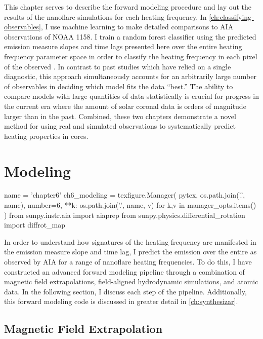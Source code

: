 This chapter serves to describe the forward modeling procedure and lay out the results of the nanoflare simulations for each heating frequency. In \autoref{ch:classifying-observables}, I use machine learning to make detailed comparisons to AIA observations of \AR{} NOAA 1158. I train a random forest classifier using the predicted emission measure slopes and time lags presented here over the entire heating frequency parameter space in order to classify the heating frequency in each pixel of the observed \AR{}. In contrast to past studies which have relied on a single diagnostic, this approach simultaneously accounts for an arbitrarily large number of observables in deciding which model fits the data ``best.'' The ability to compare models with large quantities of data statistically is crucial for progress in the current era where the amount of solar coronal data is orders of magnitude larger than in the past.  Combined, these two chapters demonstrate a novel method for using real and simulated observations to systematically predict heating properties in \AR{} cores.

\section{Modeling}\label{sec:modeling-observables:modeling}

\begin{pycode}
name = 'chapter6'
ch6_modeling = texfigure.Manager(
    pytex,
    os.path.join('.', name),
    number=6,
    **{k: os.path.join('.', name, v) for k,v in manager_opts.items()}
)
from sunpy.instr.aia import aiaprep
from sunpy.physics.differential_rotation import diffrot_map
\end{pycode}

In order to understand how signatures of the heating frequency are manifested in the emission measure slope and time lag, I predict the emission over the entire \AR{} as observed by AIA for a range of nanoflare heating frequencies. To do this, I have constructed an advanced forward modeling pipeline through a combination of magnetic field extrapolations, field-aligned hydrodynamic simulations, and atomic data. In the following section, I discuss each step of the pipeline. Additionally, this forward modeling code is discussed in greater detail in \autoref{ch:synthesizar}.

\subsection{Magnetic Field Extrapolation}\label{sec:modeling-observables:field}

